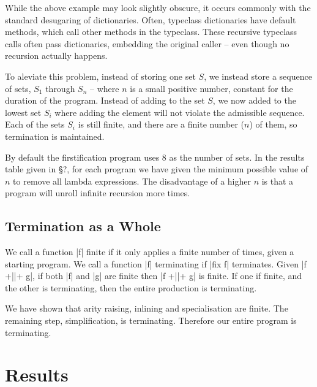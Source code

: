 \documentclass[preprint]{sigplanconf}
\begin{document}
While the above example may look slightly obscure, it occurs commonly with the standard desugaring of dictionaries. Often, typeclass dictionaries have default methods, which call other methods in the typeclass. These recursive typeclass calls often pass dictionaries, embedding the original caller -- even though no recursion actually happens.


To aleviate this problem, instead of storing one set $S$, we instead store a sequence of sets, $S_1$ through $S_n$ -- where $n$ is a small positive number, constant for the duration of the program. Instead of adding to the set $S$, we now added to the lowest set $S_i$ where adding the element will not violate the admissible sequence. Each of the sets $S_i$ is still finite, and there are a finite number ($n$) of them, so termination is maintained.

By default the firstification program uses 8 as the number of sets. In the results table given in \S?, for each program we have given the minimum possible value of $n$ to remove all lambda expressions. The disadvantage of a higher $n$ is that a program will unroll infinite recursion more times.

\subsection{Termination as a Whole}

We call a function |f| finite if it only applies a finite number of times, given a starting program. We call a function |f| terminating if |fix f| terminates. Given |f +||+ g|, if both |f| and |g| are finite then |f +||+ g| is finite. If one if finite, and the other is terminating, then the entire production is terminating.

We have shown that arity raising, inlining and specialisation are finite. The remaining step, simplification, is terminating. Therefore our entire program is terminating.

\section{Results}
\end{document}
